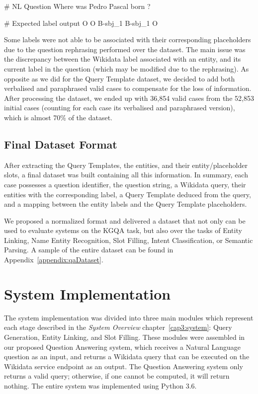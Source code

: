 \begin{sparqlcode}[%
    caption={BIO label representation for a Natural Language Question.}, 
    label={lst:sequenceLabelingExampleLcquad2}]
# NL Question
Where was Pedro Pascal born ?

# Expected label output
O O B-sbj_1 B-sbj_1 O
\end{sparqlcode}

Some labels were not able to be associated with their corresponding placeholders due to the 
question rephrasing performed over the \LCQuADtwo{} dataset. The main issue was the discrepancy 
between the Wikidata label associated with an entity, and its current label in the question 
(which may be modified due to the rephrasing). As opposite as we did for the Query Template 
dataset, we decided to add both verbalised and paraphrased valid cases to compensate 
for the loss of information. After processing the dataset, we ended up with 36,854 valid cases 
from the 52,853 initial cases (counting for each case its verbalised and paraphrased version), 
which is almost 70\% of the dataset.

\subsection{Final Dataset Format}
\label{cap4:experimentalDesign/QaDataset/finalFormat}
After extracting the Query Templates, the entities, and their entity/placeholder slots, a final 
\LCQuADtwo{} dataset was built containing all this information. In summary, each case possesses a 
question identifier, the question string, a Wikidata \SPARQL{} query, their entities with the 
corresponding label, a Query Template deduced from the \SPARQL{} query, and a mapping between the 
entity labels and the Query Template placeholders. 

We proposed a normalized format and delivered a dataset that not only can be used to evaluate 
systems on the KGQA task, but also over the tasks of Entity Linking, Name Entity Recognition, 
Slot Filling, Intent Classification, or Semantic Parsing. A sample of the entire dataset can be 
found in Appendix~\ref{appendix:qaDataset}.

\section{System Implementation}
\label{cap4:experimentalDesign/systemImplementation}
The system implementation was divided into three main modules which represent each stage 
described in the \textit{System Overview} chapter~\ref{cap3:system}: Query Generation, Entity Linking, and Slot 
Filling. These modules were assembled in our proposed Question Answering system, which receives 
a Natural Language question as an input, and returns a Wikidata \SPARQL{} query that can be executed 
on the Wikidata service endpoint as an output. The Question Answering system only returns a valid 
\SPARQL{} query; otherwise, if one cannot be computed, it will return nothing. The entire system was implemented 
using Python 3.6. 

